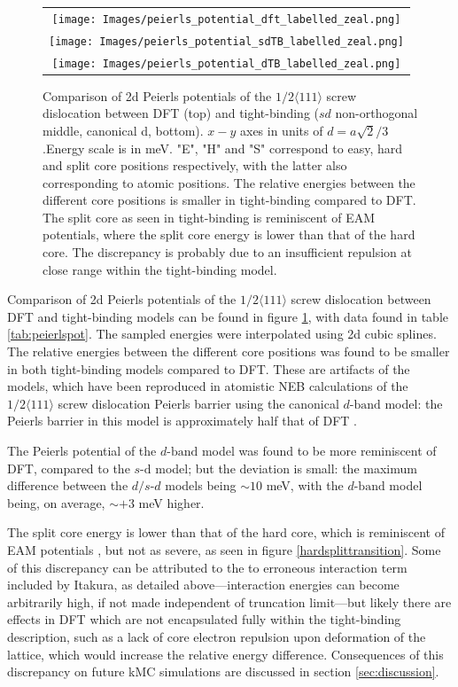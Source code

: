 \documentclass[a4paper,12pt,oneside,print,numbered,index,PageStyleIII]{PhDThesisPSnPDF}
\begin{document}
        \begin{figure}
\centering
    \begin{tabular}{c}
	     \texttt{[image: Images/peierls\_potential\_dft\_labelled\_zeal.png]} \\
             \texttt{[image: Images/peierls\_potential\_sdTB\_labelled\_zeal.png]}  \\
             \texttt{[image: Images/peierls\_potential\_dTB\_labelled\_zeal.png]}  \\
    \end{tabular}
\caption{Comparison of 2d Peierls potentials of the $1/2\langle 111\rangle$ screw dislocation between DFT \cite{Itakura2012} (top) and tight-binding ($sd$ non-orthogonal middle, canonical d, bottom). $x-y$ axes in units of $d=a\sqrt{2} / 3$.Energy scale is in meV. "E", "H" and "S" correspond to easy, hard and split core positions respectively, with the latter also corresponding to atomic positions. The relative energies between the different core positions is smaller in tight-binding compared to DFT. The split core as seen in tight-binding is reminiscent of EAM potentials, where the split core energy is lower than that of the hard core. The discrepancy is probably due to an insufficient repulsion at close range within the tight-binding model.}
	\label{fig:peierlspot}
    \end{figure}



Comparison of 2d Peierls potentials of the \(1/2\langle 111 \rangle\)
screw dislocation between DFT and tight-binding models can be found in
figure \ref{fig:peierlspot}, with data found in table
\ref{tab:peierlspot}. The sampled energies were interpolated using 2d
cubic splines. The relative energies between the different core
positions was found to be smaller in both tight-binding models compared
to DFT. These are artifacts of the models, which have been reproduced in
atomistic NEB calculations of the \(1/2\langle 111\rangle\) screw
dislocation Peierls barrier using the canonical \(d\text{-band}\) model:
the Peierls barrier in this model is approximately half
that of DFT \cite{Simpson2019}.

The Peierls potential of the \(d\text{-band}\) model was found to be more
reminiscent of DFT, compared to the \(s\text{-d}\) model; but the
deviation is small: the maximum difference between the \(d\text{/}s\text{-}d\)
models being \(\sim 10\) meV, with the \(d\text{-band}\) model being, on average,
\(\sim+3\) meV higher.

The split core energy is lower than that of the hard
core, which is reminiscent of EAM potentials \cite{Itakura2012}, but not
as severe, as seen in figure \ref{hardsplittransition}. Some of
this discrepancy can be attributed to the to erroneous interaction term
included by Itakura, as detailed above---interaction energies can become
arbitrarily high, if not made independent of truncation limit---but
likely there are effects in DFT which are not encapsulated fully within
the tight-binding description, such as a lack of core electron repulsion
upon deformation of the lattice, which would increase the relative
energy difference. Consequences of this discrepancy on future kMC
simulations are discussed in section \ref{sec:discussion}.
\end{document}
